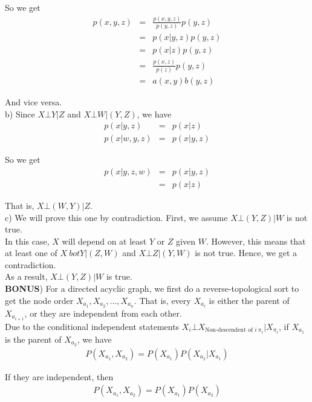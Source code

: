 \documentclass[12pt]{article}
\begin{document}
So we get
\begin{eqnarray*}
  p(x, y, z)
  &=& \frac {p(x,y,z)}{p(y,z)} p(y,z) \\
  &=& p(x | y, z) p(y,z) \\
  &=& p(x | z) p(y,z) \\
  &=& \frac {p(x, z)}{p(z)} p(y,z) \\
  &=& a(x,y) b(y,z)
\end{eqnarray*}

And vice versa. \\

b) Since $X \bot Y | Z$ and $X \bot W | (Y, Z)$, we have
\begin{eqnarray*}
  p(x|y,z) &=& p(x|z) \\
  p(x|w,y,z) &=& p(x|y,z)
\end{eqnarray*}

So we get
\begin{eqnarray*}
  p(x|y,z,w)
  &=& p(x|y,z) \\
  &=& p(x|z)
\end{eqnarray*}
 
That is, $X \bot (W,Y) | Z$. \\

c) We will prove this one by contradiction. First, we assume $X \bot (Y,Z)|W$ is not true. \\

In this case, $X$ will depend on at least $Y$ or $Z$ given $W$. However, this means that at least one of $X \ bot Y |(Z,W)$ and $X \bot Z|(Y,W)$ is not true. Hence, we get a contradiction. \\

As a result, $X \bot (Y,Z)|W$ is true. \\

\textbf{BONUS}) For a directed acyclic graph, we first do a reverse-topological sort to get the node order $X_{a_1}, X_{a_2}, \dots, X_{a_n}$. That is, every $X_{a_{i}}$ is either the parent of $X_{a_{i+1}}$, or they are independent from each other. \\

Due to the conditional independent statements $X_i \bot X_{\text{Non-descendent of } i \ \pi_i} | X_{\pi_i}$, if $X_{a_1}$ is the parent of  $X_{a_{2}}$, we have
\begin{eqnarray*}
  P(X_{a_1}, X_{a_2}) = P(X_{a_1}) P(X_{a_2} | X_{a_1})
\end{eqnarray*}

If they are independent, then
\begin{eqnarray*}
  P(X_{a_1}, X_{a_2}) = P(X_{a_1}) P(X_{a_2})
\end{eqnarray*}
\end{document}
